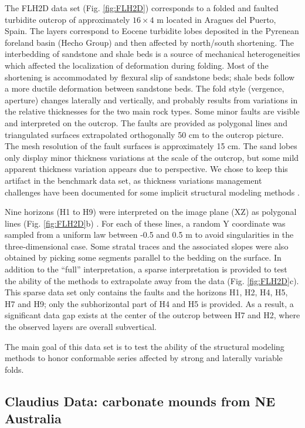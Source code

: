 \documentclass[preprint]{elsarticle}
\begin{document}
The FLH2D data set (Fig. \ref{fig:FLH2D}) corresponds to a folded and faulted turbidite outcrop of approximately $16 \times 4$ m located in Aragues del Puerto, Spain.  The layers correspond to Eocene turbidite lobes deposited in the Pyrenean foreland basin (Hecho Group) and then affected by north/south shortening. The interbedding of sandstone and shale beds is a source of mechanical heterogeneities which affected the localization of deformation during folding. Most of the shortening is accommodated by flexural slip of sandstone beds; shale beds follow a more ductile deformation between sandstone beds. The fold style (vergence, aperture) changes laterally and vertically, and probably results from variations in the relative thicknesses for the two main rock types. Some minor faults are visible and interpreted on the outcrop. The faults are provided as polygonal lines and triangulated surfaces extrapolated orthogonally 50 cm to the outcrop picture. The mesh resolution of the fault surfaces is approximately 15 cm. The sand lobes only display minor thickness variations at the scale of the outcrop, but some mild apparent thickness variation appears due to perspective. We chose to keep this artifact in the benchmark data set, as thickness variations management challenges have been documented for some implicit structural modeling methods \citep{Laurent2016EaPSL}. 

Nine horizons (H1 to H9) were interpreted on the image plane (XZ) as polygonal lines (Fig. \ref{fig:FLH2D}b) . For each of these lines, a random Y coordinate was sampled from a uniform law between -0.5 and 0.5 m to avoid singularities in the three-dimensional case. Some stratal traces and the associated slopes were also obtained by picking some segments parallel to the bedding on the surface. In addition to the ``full'' interpretation, a sparse interpretation is provided to test the ability of the methods to extrapolate away from the data (Fig. \ref{fig:FLH2D}c). This sparse data set only contains the faults and the horizons H1, H2, H4, H5, H7 and H9; only the subhorizontal part of H4 and H5 is provided. As a result, a significant data gap exists at the center of the outcrop between H7 and H2, where the observed layers are overall subvertical. 

The main goal of this data set is to test the ability of the structural modeling methods to honor conformable series affected by strong and laterally variable folds. 

\subsection{Claudius Data: carbonate mounds from NE Australia}
\end{document}
